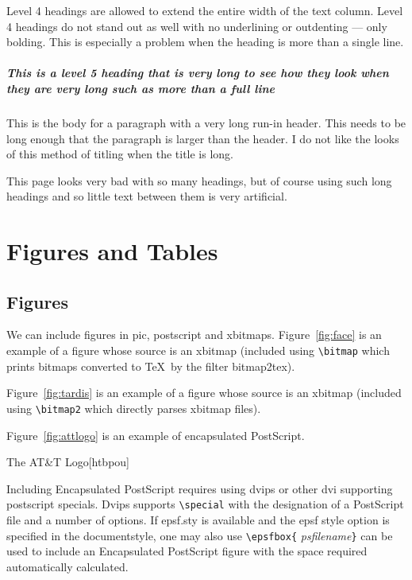 Level 4 headings are allowed to extend the entire width of the text
column.  Level 4 headings do not stand out as well with no underlining
or outdenting --- only bolding.  This is especially a problem when the
heading is more than a single line.


\subparagraph{This is a level 5 heading that is very long to see how
they look when they are very long such as more than a full line} This
is the body for a paragraph with a very long run-in header.  This
needs to be long enough that the paragraph is larger than the header.
I do not like the looks of this method of titling when the title is long.


This page looks very bad with so many headings, but of course using such long 
headings and so little text between them is very artificial.


\section{Figures and Tables}
\subsection{Figures}
We can include figures in pic, postscript and xbitmaps. 
Figure~\ref{fig:face} is an example of a figure whose source is an
xbitmap (included using \verb|\bitmap| which prints bitmaps converted
to \TeX\ by the filter bitmap2tex).


Figure~\ref{fig:tardis} is an example of a figure whose source is an
xbitmap (included using \verb|\bitmap2| which directly parses xbitmap files).

Figure~\ref{fig:attlogo} is an example of encapsulated PostScript.
\begin{capfigure}{\label{fig:attlogo}The AT\&T Logo}[htbpou]
\end{capfigure}
Including Encapsulated PostScript requires using dvips or other dvi
supporting postscript specials.  Dvips supports  \verb|\special| with
the designation of a PostScript file and a number of options.  If
epsf.sty is available and the epsf style option is specified in the
documentstyle, one may also use \verb|\epsfbox{|{\it
psfilename}\verb|}| can be used to include an Encapsulated PostScript
figure with the space required automatically calculated.

